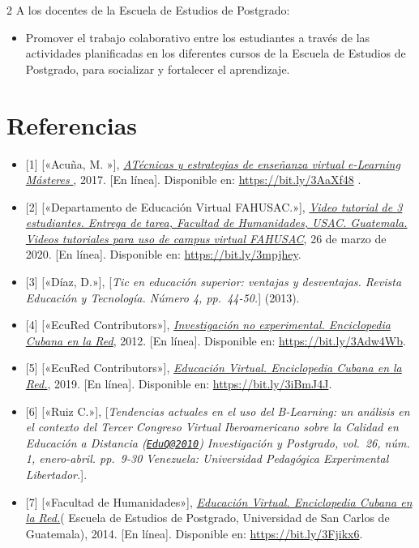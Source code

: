 \documentclass[12pt,spanish,Letterpaper,openany]{book}
\providecommand{\tightlist}{%
  \setlength{\itemsep}{0pt}\setlength{\parskip}{0pt}}
\begin{document}
\begin {multicols}{2}
A los docentes de la Escuela de Estudios de Postgrado:

\begin{itemize}
\tightlist
\item
  Promover el trabajo colaborativo entre los estudiantes a través de las actividades
  planificadas en los diferentes cursos de la Escuela de Estudios de Postgrado, para
  socializar y fortalecer el aprendizaje.
\end{itemize}

\hypertarget{referencias-2}{%
\section{Referencias}\label{referencias-2}}

\begin{itemize}
\item
  {[}1{]} {[}«Acuña, M. »{]}, \href{http://elearningmasters.galileo.edu/2017/10/17/tecnicas-y-estrategias-de-ensenanza-virtual/}{\emph{ATécnicas y estrategias de enseñanza virtual e-Learning Másteres }}, 2017. {[}En línea{]}. Disponible en: \url{https://bit.ly/3AaXf48} .
\item
  {[}2{]} {[}«Departamento de Educación Virtual FAHUSAC.»{]}, \href{https://www.youtube.com/watch?v=vh2v8cn8920}{\emph{Video tutorial de 3 estudiantes. Entrega de tarea, Facultad de Humanidades, USAC. Guatemala. Videos tutoriales para uso de campus virtual FAHUSAC}}, 26 de marzo de 2020. {[}En línea{]}. Disponible en: \url{https://bit.ly/3mpjhey}.
\item
  {[}3{]} {[}«Díaz, D.»{]}, {[}\emph{Tic en educación superior: ventajas y desventajas. Revista Educación y Tecnología. Número 4, pp.~44-50.}{]} (2013).
\item
  {[}4{]} {[}«EcuRed Contributors»{]}, \href{https://www.ecured.cu/index.php?\%20title=Investigaci\%C3\%B3n_no_experimental\&oldid=1451545.}{\emph{Investigación no experimental. Enciclopedia Cubana en la Red}}, 2012. {[}En línea{]}. Disponible en: \url{https://bit.ly/3Adw4Wb}.
\item
  {[}5{]} {[}«EcuRed Contributors»{]}, \href{https://www.ecured.cu/index.php?title=\%20Educaci\%C3\%B3n_Virtual\&oldid=3417611}{\emph{Educación Virtual. Enciclopedia Cubana en la Red.}}, 2019. {[}En línea{]}. Disponible en: \url{https://bit.ly/3iBmJ4J}.
\item
  {[}6{]} {[}«Ruiz C.»{]}, {[}\emph{Tendencias actuales en el uso del B-Learning: un análisis en el contexto del Tercer Congreso Virtual Iberoamericano sobre la Calidad en Educación a Distancia (\href{mailto:EduQ@2010}{\nolinkurl{EduQ@2010}}) Investigación y Postgrado, vol.~26, núm. 1, enero-abril. pp.~9-30 Venezuela: Universidad Pedagógica Experimental Libertador.}{]}.
\item
  {[}7{]} {[}«Facultad de Humanidades»{]}, \href{http://www.humanidades.usac.\%20edu.gt/usac/postgrado/}{\emph{Educación Virtual. Enciclopedia Cubana en la Red.}}( Escuela de Estudios de Postgrado, Universidad de San Carlos de Guatemala), 2014. {[}En línea{]}. Disponible en: \url{https://bit.ly/3Fjikx6}.
\end{itemize}

\end {multicols}
\end{document}
